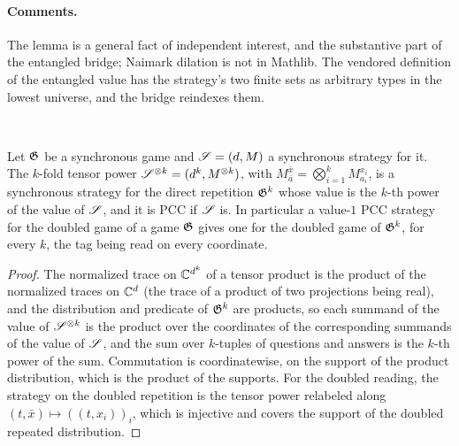 \paragraph{Comments.} The lemma is a general fact of independent interest, and the
substantive part of the entangled bridge; Naimark dilation is not in Mathlib. The
vendored definition of the entangled value has the strategy's two finite sets as
arbitrary types in the lowest universe, and the bridge reindexes them.

\effortHard\ \qlib

\begin{lemma}
\label{lem:tensor-power-pcc}
\leanok
Let $\mathfrak{G}$ be a synchronous game and $\mathscr{S} = (d, M)$ a synchronous strategy for it.
The $k$-fold tensor power $\mathscr{S}^{\otimes k} = (d^k, M^{\otimes k})$, with $M^{\bar{x}}_{\bar{a}}
= \bigotimes_{i=1}^{k} M^{x_i}_{a_i}$, is a synchronous strategy for the direct repetition
$\mathfrak{G}^{k}$ whose value is the $k$-th power of the value of $\mathscr{S}$, and it is PCC if
$\mathscr{S}$ is. In particular a value-$1$ PCC strategy for the doubled game of a game
$\mathfrak{G}$ gives one for the doubled game of $\mathfrak{G}^{k}$, for every $k$, the tag being read on
every coordinate.
\end{lemma}
\begin{proof}
\leanok
The normalized trace on $\mathbb{C}^{d^k}$ of a tensor product is the product of the normalized
traces on $\mathbb{C}^d$ (the trace of a product of two projections being real), and the
distribution and predicate of $\mathfrak{G}^{k}$ are products, so each summand of the value of
$\mathscr{S}^{\otimes k}$ is the product over the coordinates of the corresponding summands of the
value of $\mathscr{S}$, and the sum over $k$-tuples of questions and answers is the $k$-th power
of the sum. Commutation is coordinatewise, on the support of the product distribution, which
is the product of the supports. For the doubled reading, the strategy on the doubled
repetition is the tensor power relabeled along $(t, \bar{x}) \mapsto ((t, x_i))_i$, which is
injective and covers the support of the doubled repeated distribution.
\end{proof}

